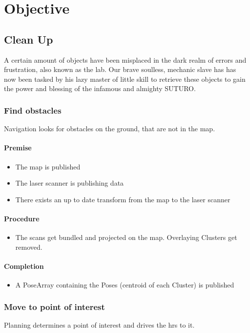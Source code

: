 \documentclass[main.tex]{subfiles}
\begin{document}
	
	\chapter{Objective}
	\section{Clean Up}
	A certain amount of objects have been misplaced in the dark realm of errors and frustration, also known as the lab. Our brave soulless, mechanic slave has has now been tasked by his lazy master of little skill to retrieve these objects to gain the power and blessing of the infamous and almighty SUTURO.
	
	\subsection{Find obstacles}
	Navigation looks for obstacles on the ground, that are not in the map.
	
	\subsubsection{Premise}
	\begin{itemize}
		\item The map is published
		\item The laser scanner is publishing data
		\item There exists an up to date transform from the map to the laser scanner
	\end{itemize} 
	
	\subsubsection{Procedure}
	\begin{itemize}			
		\item The scans get bundled and projected on the map. Overlaying Clusters get removed.
	\end{itemize}
	
	\subsubsection{Completion}
	\begin{itemize}
		\item A PoseArray containing the Poses (centroid of each Cluster) is published		
	\end{itemize}
	
	\subsection{Move to point of interest}
	Planning determines a point of interest and drives the hrs to it.
	
\end{document}
